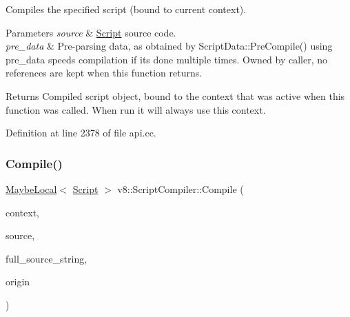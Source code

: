 Compiles the specified script (bound to current context).


\begin{DoxyParams}{Parameters}
{\em source} & \mbox{\hyperlink{classv8_1_1Script}{Script}} source code. \\
\hline
{\em pre\+\_\+data} & Pre-\/parsing data, as obtained by Script\+Data\+::\+Pre\+Compile() using pre\+\_\+data speeds compilation if it\textquotesingle{}s done multiple times. Owned by caller, no references are kept when this function returns. \\
\hline
\end{DoxyParams}
\begin{DoxyReturn}{Returns}
Compiled script object, bound to the context that was active when this function was called. When run it will always use this context. 
\end{DoxyReturn}


Definition at line 2378 of file api.\+cc.

\mbox{\label{classv8_1_1ScriptCompiler_a47429c4fb199c3bc55cb5fd7f8423d8e}} 
\subsubsection{\texorpdfstring{Compile()}{Compile()}\hspace{0.1cm}{\footnotesize\ttfamily [2/2]}}
{\footnotesize\ttfamily \mbox{\hyperlink{classv8_1_1MaybeLocal}{Maybe\+Local}}$<$ \mbox{\hyperlink{classv8_1_1Script}{Script}} $>$ v8\+::\+Script\+Compiler\+::\+Compile (\begin{DoxyParamCaption}\item[{\mbox{\hyperlink{classv8_1_1Local}{Local}}$<$ Context $>$}]{context,  }\item[{\mbox{\hyperlink{classv8_1_1ScriptCompiler_1_1StreamedSource}{Streamed\+Source}} $\ast$}]{source,  }\item[{\mbox{\hyperlink{classv8_1_1Local}{Local}}$<$ \mbox{\hyperlink{classv8_1_1String}{String}} $>$}]{full\+\_\+source\+\_\+string,  }\item[{const \mbox{\hyperlink{classv8_1_1ScriptOrigin}{Script\+Origin}} \&}]{origin }\end{DoxyParamCaption})\hspace{0.3cm}{\ttfamily [static]}}

